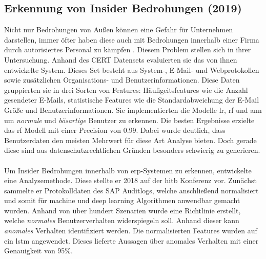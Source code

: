 \documentclass[
    12pt, %
    DIV10,
    ngerman, %
    a4paper, %
    oneside, %
    titlepage, %
    parskip=half, %
    headings=normal, %
    listof=totoc, %
    bibliography=totoc, %
    index=totoc, %
    captions=tableheading, %
    final %
]{scrreprt}
\begin{document}
\subsection{Erkennung von Insider Bedrohungen (2019)}\label{cert}
Nicht nur Bedrohungen von Au{\ss}en können eine Gefahr für Unternehmen darstellen, immer öfter haben diese auch mit Bedrohungen innerhalb einer Firma durch autorisiertes Personal zu kämpfen \parencite{Partners}. Diesem Problem stellen sich \textcite{Le2019} in ihrer Untersuchung. Anhand des CERT Datensets \parencite{glasser2013bridging} evaluierten sie das von ihnen entwickelte System. Dieses Set besteht aus System-, E-Mail- und Webprotokollen sowie zusätzlichen Organisations- und Benutzerinformationen. Diese Daten gruppierten sie in drei Sorten von Features: Häufigeitsfeatures wie die Anzahl gesendeter E-Mails, statistische Features wie die Standardabweichung der E-Mail Grö{\ss}e und Benutzerinformationen. Sie implementierten die Modelle \ac{lr}, \ac{rf} und \ac{ann} um \emph{normale} und \emph{bösartige} Benutzer zu erkennen. Die besten Ergebnisse erzielte das \ac{rf} Modell mit einer Precision von 0.99. Dabei wurde deutlich, dass Benutzerdaten den meisten Mehrwert für diese Art Analyse bieten. Doch gerade diese sind aus datenschutzrechtlichen Gründen besonders schwierig zu generieren. 
\\\\
Um Insider Bedrohungen innerhalb von \ac{erp}-Systemen zu erkennen, entwickelte \textcite{Neyolov} eine Analysemethode. Diese stellte er 2018 auf der \ac{hitb} Konferenz vor. Zunächst sammelte er Protokolldaten des SAP Auditlogs, welche anschlie{\ss}end normalisiert und somit für machine und deep learning Algorithmen anwendbar gemacht wurden. Anhand von über hundert Szenarien wurde eine Richtlinie erstellt, welche \emph{normales} Benutzerverhalten widerspiegeln soll. Anhand dieser kann \emph{anomales} Verhalten identifiziert werden. Die normalisierten Features wurden auf ein \ac{lstm} angewendet. Dieses lieferte Aussagen über anomales Verhalten mit einer Genauigkeit von 95\%.
\end{document}
